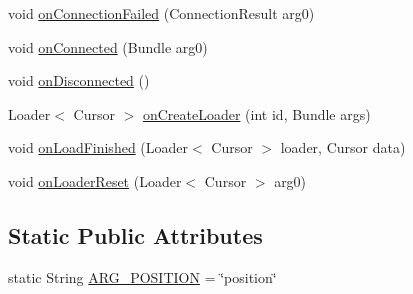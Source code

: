 \begin{DoxyCompactItemize}
\item 
void \hyperlink{classuk_1_1ac_1_1swan_1_1digitaltrails_1_1fragments_1_1_map_fragment_a1a6b97b8d21be5025954db4898188fbf}{on\+Connection\+Failed} (Connection\+Result arg0)
\item 
void \hyperlink{classuk_1_1ac_1_1swan_1_1digitaltrails_1_1fragments_1_1_map_fragment_a6f50aaa1a3e7a2455c69f6f2d637c5b0}{on\+Connected} (Bundle arg0)
\item 
void \hyperlink{classuk_1_1ac_1_1swan_1_1digitaltrails_1_1fragments_1_1_map_fragment_a3a70b590f6805f4cf0a2fef78655dd7f}{on\+Disconnected} ()
\item 
Loader$<$ Cursor $>$ \hyperlink{classuk_1_1ac_1_1swan_1_1digitaltrails_1_1fragments_1_1_map_fragment_a965207c6caeed51ea42d2cd5601ac7a9}{on\+Create\+Loader} (int id, Bundle args)
\item 
void \hyperlink{classuk_1_1ac_1_1swan_1_1digitaltrails_1_1fragments_1_1_map_fragment_a0d68affd08464bcc7b08af1b2205a612}{on\+Load\+Finished} (Loader$<$ Cursor $>$ loader, Cursor data)
\item 
void \hyperlink{classuk_1_1ac_1_1swan_1_1digitaltrails_1_1fragments_1_1_map_fragment_aa1c7a413fcfbcd95b6acb9ded41fcb53}{on\+Loader\+Reset} (Loader$<$ Cursor $>$ arg0)
\end{DoxyCompactItemize}
\subsection*{Static Public Attributes}
\begin{DoxyCompactItemize}
\item 
static String \hyperlink{classuk_1_1ac_1_1swan_1_1digitaltrails_1_1fragments_1_1_map_fragment_afb16e94fea40dd9c0716e5b1f4c30dc8}{A\+R\+G\+\_\+\+P\+O\+S\+I\+T\+I\+O\+N} = \char`\"{}position\char`\"{}
\end{DoxyCompactItemize}
